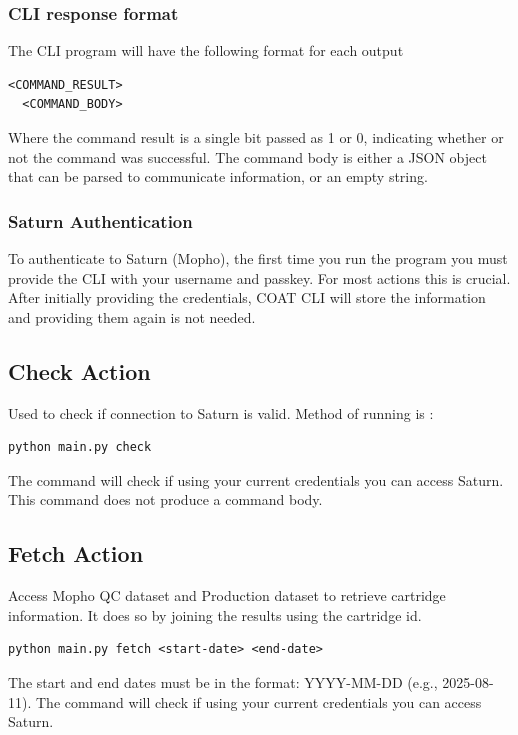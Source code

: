 \documentclass[12pt,a4paper]{article}
\begin{document}
\subsubsection{CLI response format}
The CLI program will have the following format for each output
\begin{lstlisting}[]
  <COMMAND_RESULT>
  <COMMAND_BODY>
\end{lstlisting}
Where the command result is a single bit passed as 1 or 0, indicating whether or not the command was successful.
The command body is either a JSON object that can be parsed to communicate information, or an empty string.
\subsubsection{Saturn Authentication}
To authenticate to Saturn (Mopho), the first time you run the program you must provide
the CLI with your username and passkey. For most actions this is  crucial. After initially providing the
credentials, COAT CLI will store the information and providing them again is not needed.
\subsection{Check Action}
Used to check if connection to Saturn is valid. Method of running is :
\begin{lstlisting}[]
  python main.py check
\end{lstlisting}
The command will check if using your current credentials you can access Saturn. This command does not produce a command body.

\subsection{Fetch Action}
Access Mopho QC dataset and Production dataset to retrieve cartridge information. It does so by joining the results
using the cartridge id.
\begin{lstlisting}[]
  python main.py fetch <start-date> <end-date>
\end{lstlisting}
The start and end dates must be in the format: YYYY-MM-DD (e.g., 2025-08-11). \newline
The command will check if using your current credentials you can access Saturn.
\end{document}

